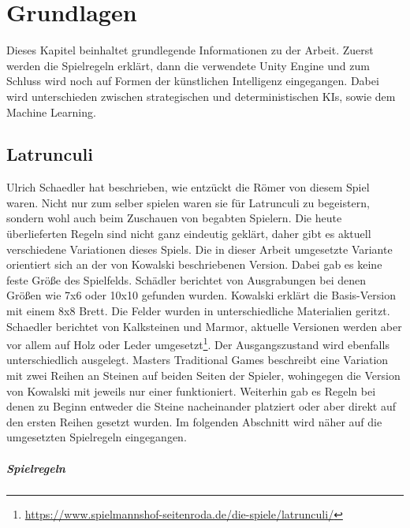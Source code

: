 
\chapter{Grundlagen}
\label{ch:Grundlagen}
Dieses Kapitel beinhaltet grundlegende Informationen zu der Arbeit. Zuerst werden die Spielregeln erklärt, dann die verwendete Unity Engine und zum Schluss wird noch auf Formen der künstlichen Intelligenz eingegangen. Dabei wird unterschieden zwischen strategischen und deterministischen KIs, sowie dem Machine Learning.
\section{Latrunculi}
\label{ch:Grundlagen:sec:Latrunculi}
Ulrich Schaedler\cite{homoLudens} hat beschrieben, wie entzückt die Römer von diesem Spiel waren. Nicht nur zum selber spielen waren sie für Latrunculi zu begeistern, sondern wohl auch beim Zuschauen von begabten Spielern. Die heute überlieferten Regeln sind nicht ganz eindeutig geklärt, daher gibt es aktuell verschiedene Variationen dieses Spiels. Die in dieser Arbeit umgesetzte Variante orientiert sich an der von Kowalski\cite{comscigate} beschriebenen Version. Dabei gab es keine feste Größe des Spielfelds. Schädler\cite{homoLudens} berichtet von Ausgrabungen bei denen Größen wie 7x6 oder 10x10 gefunden wurden. Kowalski\cite{comscigate} erklärt die Basis-Version mit einem 8x8 Brett. Die Felder wurden in unterschiedliche Materialien geritzt. Schaedler berichtet von Kalksteinen und Marmor, aktuelle Versionen werden aber vor allem auf Holz oder Leder umgesetzt\footnote[4]{\url{https://www.spielmannshof-seitenroda.de/die-spiele/latrunculi/}}. Der Ausgangszustand wird ebenfalls unterschiedlich ausgelegt. Masters Traditional Games\cite{mastersgames} beschreibt eine Variation mit zwei Reihen an Steinen auf beiden Seiten der Spieler, wohingegen die Version von Kowalski\cite{comscigate} mit jeweils nur einer funktioniert. Weiterhin gab es Regeln bei denen zu Beginn entweder die Steine nacheinander platziert\cite{homoLudens} oder aber direkt auf den ersten Reihen gesetzt wurden. Im folgenden Abschnitt wird näher auf die umgesetzten Spielregeln eingegangen.
\paragraph{Spielregeln}
\label{ch:Grundlagen:sec:Spielregeln}

